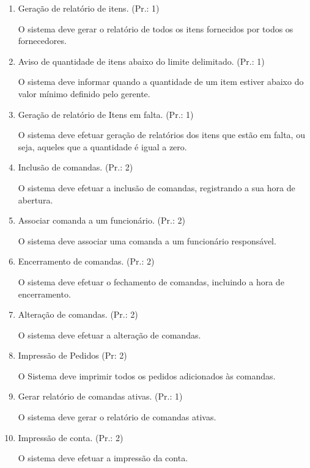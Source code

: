 \begin{enumerate}[
	label=RF\arabic{*}, 
	ref=(RF\arabic{*}),
	leftmargin=1.5em,
	itemindent=4.5em]
O sistema deve efetuar a consulta dos dados dos itens.\par
\item Geração de relatório de itens. (Pr.: 1)\par
O sistema deve gerar o relatório de todos os itens fornecidos por todos os fornecedores.\par
\item Aviso de quantidade de itens abaixo do limite delimitado. (Pr.: 1)\par
O sistema deve informar quando a quantidade de um item estiver abaixo do valor mínimo definido pelo gerente.\par
\item Geração de relatório de Itens em falta. (Pr.: 1)\par
O sistema deve efetuar geração de relatórios dos itens que estão em falta, ou seja, aqueles que a quantidade é igual a zero.\par
\item Inclusão de comandas. (Pr.: 2)\par
O sistema deve efetuar a inclusão de comandas, registrando a sua hora de abertura.\par
\item Associar comanda a um funcionário. (Pr.: 2)\par
O sistema deve associar uma comanda a um funcionário responsável.\par
\item Encerramento de comandas. (Pr.: 2)\par
O sistema deve efetuar o fechamento de comandas, incluindo a hora de encerramento.\par
\item Alteração de comandas. (Pr.: 2)\par
O sistema deve efetuar a alteração de comandas.\par
\item Impressão de Pedidos (Pr: 2)\par
O Sistema deve imprimir todos os pedidos adicionados às comandas.\par
\item Gerar relatório de comandas ativas. (Pr.: 1)\par
O sistema deve gerar o relatório de comandas ativas.\par
\item Impressão de conta. (Pr.: 2)\par
O sistema deve efetuar a impressão da conta.\par

\end{enumerate}

